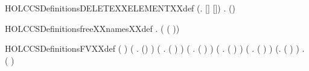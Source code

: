 \begin{SaveVerbatim}{HOLCCSDefinitionsDELETEXXELEMENTXXdef}
\HOLTokenTurnstile{} (\HOLSymConst{\HOLTokenForall{}}.   [] \HOLSymConst{=} []) \HOLSymConst{\HOLTokenConj{}}
   \HOLSymConst{\HOLTokenForall{}}  .
         (\HOLSymConst{::}) \HOLSymConst{=}
         \HOLSymConst{=}     
        \HOLSymConst{::}  
\end{SaveVerbatim}
\newcommand{\HOLCCSDefinitionsDELETEXXELEMENTXXdef}{\UseVerbatim{HOLCCSDefinitionsDELETEXXELEMENTXXdef}}
\begin{SaveVerbatim}{HOLCCSDefinitionsfreeXXnamesXXdef}
\HOLTokenTurnstile{} \HOLSymConst{\HOLTokenForall{}}.   \HOLSymConst{=}   ( ( ))
\end{SaveVerbatim}
\newcommand{\HOLCCSDefinitionsfreeXXnamesXXdef}{\UseVerbatim{HOLCCSDefinitionsfreeXXnamesXXdef}}
\begin{SaveVerbatim}{HOLCCSDefinitionsFVXXdef}
\HOLTokenTurnstile{} (  \HOLSymConst{=} \HOLTokenLeftbrace{}\HOLTokenRightbrace{}) \HOLSymConst{\HOLTokenConj{}} (\HOLSymConst{\HOLTokenForall{}} .  () \HOLSymConst{=}  ) \HOLSymConst{\HOLTokenConj{}}
   (\HOLSymConst{\HOLTokenForall{}} .  ( \HOLSymConst{\ensuremath{+}} ) \HOLSymConst{=}   \HOLConst{\HOLTokenUnion{}}  ) \HOLSymConst{\HOLTokenConj{}}
   (\HOLSymConst{\HOLTokenForall{}} .  ( \HOLSymConst{\ensuremath{\parallel}} ) \HOLSymConst{=}   \HOLConst{\HOLTokenUnion{}}  ) \HOLSymConst{\HOLTokenConj{}}
   (\HOLSymConst{\HOLTokenForall{}} .  (\HOLConst{\ensuremath{\nu}}  ) \HOLSymConst{=}  ) \HOLSymConst{\HOLTokenConj{}} (\HOLSymConst{\HOLTokenForall{}} .  (  ) \HOLSymConst{=}  ) \HOLSymConst{\HOLTokenConj{}}
   (\HOLSymConst{\HOLTokenForall{}}.  ( ) \HOLSymConst{=} \HOLTokenLeftbrace{}\HOLTokenRightbrace{}) \HOLSymConst{\HOLTokenConj{}} \HOLSymConst{\HOLTokenForall{}} .  (  ) \HOLSymConst{=}    \HOLTokenLeftbrace{}\HOLTokenRightbrace{}
\end{SaveVerbatim}
